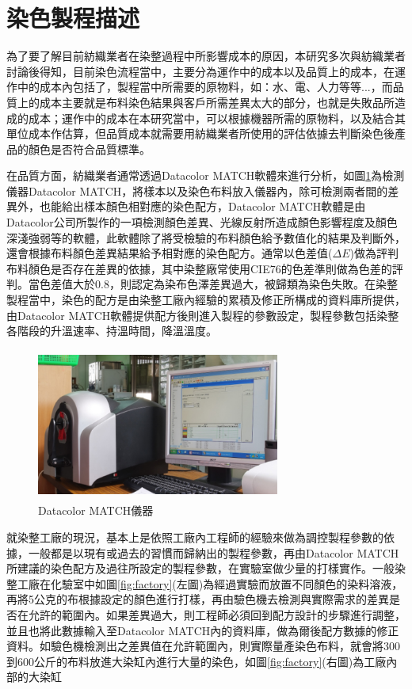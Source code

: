 \section{染色製程描述}
\label{c:ch3.1}
為了要了解目前紡織業者在染整過程中所影響成本的原因，本研究多次與紡織業者討論後得知，目前染色流程當中，主要分為運作中的成本以及品質上的成本，在運作中的成本內包括了，製程當中所需要的原物料，如：水、電、人力等等...，而品質上的成本主要就是布料染色結果與客戶所需差異太大的部分，也就是失敗品所造成的成本；運作中的成本在本研究當中，可以根據機器所需的原物料，以及結合其單位成本作估算，但品質成本就需要用紡織業者所使用的評估依據去判斷染色後產品的顏色是否符合品質標準。

在品質方面，紡織業者通常透過Datacolor MATCH軟體來進行分析，如圖\ref{fig:datacolor}為檢測儀器Datacolor MATCH，將樣本以及染色布料放入儀器內，除可檢測兩者間的差異外，也能給出樣本顏色相對應的染色配方，Datacolor MATCH軟體是由Datacolor公司所製作的一項檢測顏色差異、光線反射所造成顏色影響程度及顏色深淺強弱等的軟體，此軟體除了將受檢驗的布料顏色給予數值化的結果及判斷外，還會根據布料顏色差異結果給予相對應的染色配方。通常以色差值($\Delta E$)做為評判布料顏色是否存在差異的依據，其中染整廠常使用CIE76的色差準則做為色差的評判。當色差值大於0.8，則認定為染布色澤差異過大，被歸類為染色失敗。在染整製程當中，染色的配方是由染整工廠內經驗的累積及修正所構成的資料庫所提供，由Datacolor MATCH軟體提供配方後則進入製程的參數設定，製程參數包括染整各階段的升溫速率、持溫時間，降溫溫度。
\begin{figure}[!htbp]
\centering
\includegraphics[width=8cm, height=5cm]{Graph/datacolor.png}
\caption{Datacolor MATCH儀器}
\label{fig:datacolor}
\end{figure}
就染整工廠的現況，基本上是依照工廠內工程師的經驗來做為調控製程參數的依據，一般都是以現有或過去的習慣而歸納出的製程參數，再由Datacolor MATCH所建議的染色配方及過往所設定的製程參數，在實驗室做少量的打樣實作。一般染整工廠在化驗室中如圖\ref{fig:factory}(左圖)為經過實驗而放置不同顏色的染料溶液，再將5公克的布根據設定的顏色進行打樣，再由驗色機去檢測與實際需求的差異是否在允許的範圍內。如果差異過大，則工程師必須回到配方設計的步驟進行調整，並且也將此數據輸入至Datacolor MATCH內的資料庫，做為爾後配方數據的修正資料。如驗色機檢測出之差異值在允許範圍內，則實際量產染色布料，就會將300到600公斤的布料放進大染缸內進行大量的染色，如圖\ref{fig:factory}(右圖)為工廠內部的大染缸

